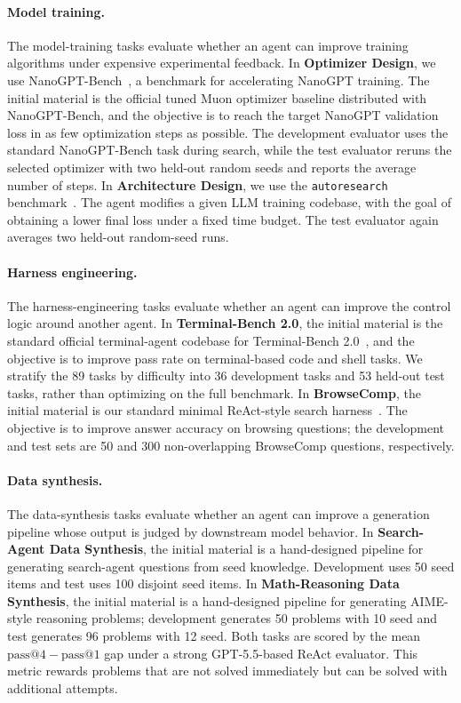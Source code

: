 \documentclass[]{selfevolagent}
\theoremstyle{plain}
\theoremstyle{definition}
\theoremstyle{remark}
\begin{document}
\paragraph{Model training.}
The model-training tasks evaluate whether an agent can improve training
algorithms under expensive experimental feedback. In \textbf{Optimizer Design},
we use NanoGPT-Bench~\citep{nanogptbench}, a benchmark for accelerating
NanoGPT training. The initial material is the official tuned Muon optimizer
baseline distributed with NanoGPT-Bench, and the objective is to reach the
target NanoGPT validation loss in as few optimization steps as possible. The
development evaluator uses the standard NanoGPT-Bench task during search, while
the test evaluator reruns the selected optimizer with two held-out random seeds
and reports the average number of steps. In \textbf{Architecture Design}, we use
the \texttt{autoresearch} benchmark~\citep{autoresearch}. The agent modifies a
given LLM training codebase, with the goal of obtaining a lower final loss under
a fixed time budget. The test evaluator again averages two held-out random-seed
runs.

\paragraph{Harness engineering.}
The harness-engineering tasks evaluate whether an agent can improve the control
logic around another agent. In \textbf{Terminal-Bench 2.0}, the initial material
is the standard official terminal-agent codebase for Terminal-Bench
2.0~\citep{terminalbench}, and the objective is to improve pass rate on
terminal-based code and shell tasks. We stratify the 89 tasks by difficulty into
36 development tasks and 53 held-out test tasks, rather than optimizing on the
full benchmark. In \textbf{BrowseComp}, the initial material is our standard
minimal ReAct-style search harness~\citep{react,browsecomp}. The objective is to
improve answer accuracy on browsing questions; the development and test sets are
50 and 300 non-overlapping BrowseComp questions, respectively.

\paragraph{Data synthesis.}
The data-synthesis tasks evaluate whether an agent can improve a generation
pipeline whose output is judged by downstream model behavior. In
\textbf{Search-Agent Data Synthesis}, the initial material is a hand-designed
pipeline for generating search-agent questions from seed knowledge. Development
uses 50 seed items and test uses 100 disjoint seed items. In
\textbf{Math-Reasoning Data Synthesis}, the initial material is a hand-designed
pipeline for generating AIME-style reasoning problems; development generates 50
problems with 10 seed and test generates 96 problems with 12 seed. Both tasks are scored by the mean
$\mathrm{pass@4}-\mathrm{pass@1}$ gap under a strong GPT-5.5-based ReAct
evaluator. This metric rewards problems that are not solved immediately but can
be solved with additional attempts.
\end{document}
